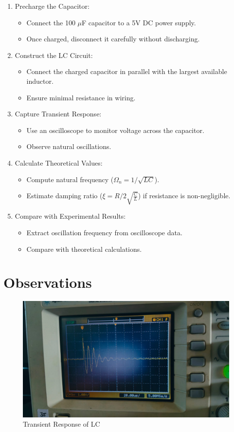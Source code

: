 \documentclass[journal]{IEEEtran}
\begin{document}
\begin{enumerate}
	\item Precharge the Capacitor:
	\begin{itemize}
		\item Connect the 100 $\mu$F capacitor to a 5V DC power supply.
		\item Once charged, disconnect it carefully without discharging.
	\end{itemize}
	
	\item Construct the LC Circuit:
	\begin{itemize}
		\item Connect the charged capacitor in parallel with the largest available inductor.
		\item Ensure minimal resistance in wiring.
	\end{itemize}
	
	\item Capture Transient Response:
	\begin{itemize}
		\item Use an oscilloscope to monitor voltage across the capacitor.
		\item Observe natural oscillations.
	\end{itemize}
	
	\item Calculate Theoretical Values:
	\begin{itemize}
		\item Compute natural frequency (\(\Omega_n = 1/\sqrt{LC}\)).
		\item Estimate damping ratio (\(\xi = R/2\sqrt{\frac{C}{L}}\)) if resistance is non-negligible.
	\end{itemize}
	
	\item Compare with Experimental Results:
	\begin{itemize}
		\item Extract oscillation frequency from oscilloscope data.
		\item Compare with theoretical calculations.
	\end{itemize}

	
\end{enumerate}

\section{Observations}

\begin{figure}[h]
	\centering
	\includegraphics[width=0.7\columnwidth]{figs/LC.jpeg}
	\caption{Transient Response of LC}
\end{figure}
\end{document}
